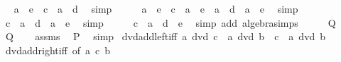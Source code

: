 \begin{isabellebody}
\ \isamarkupfalse%
\ {\isachardoublequoteopen}a\ {\isacharasterisk}{\kern0pt}\ e\ {\isacharplus}{\kern0pt}\ c\ {\isacharequal}{\kern0pt}\ a\ {\isacharasterisk}{\kern0pt}\ d{\isachardoublequoteclose}\ \isamarkupfalse%
\ simp\isanewline
\ \ \isamarkupfalse%
\ \isamarkupfalse%
\ {\isachardoublequoteopen}a\ {\isacharasterisk}{\kern0pt}\ e\ {\isacharplus}{\kern0pt}\ c\ {\isacharminus}{\kern0pt}\ a\ {\isacharasterisk}{\kern0pt}\ e\ {\isacharequal}{\kern0pt}\ a\ {\isacharasterisk}{\kern0pt}\ d\ {\isacharminus}{\kern0pt}\ a\ {\isacharasterisk}{\kern0pt}\ e{\isachardoublequoteclose}\ \isamarkupfalse%
\ simp\isanewline
\ \ \isamarkupfalse%
\ \isamarkupfalse%
\ {\isachardoublequoteopen}c\ {\isacharequal}{\kern0pt}\ a\ {\isacharasterisk}{\kern0pt}\ d\ {\isacharminus}{\kern0pt}\ a\ {\isacharasterisk}{\kern0pt}\ e{\isachardoublequoteclose}\ \isamarkupfalse%
\ simp\isanewline
\ \ \isamarkupfalse%
\ \isamarkupfalse%
\ {\isachardoublequoteopen}c\ {\isacharequal}{\kern0pt}\ a\ {\isacharasterisk}{\kern0pt}\ {\isacharparenleft}{\kern0pt}d\ {\isacharminus}{\kern0pt}\ e{\isacharparenright}{\kern0pt}{\isachardoublequoteclose}\ \isamarkupfalse%
\ {\isacharparenleft}{\kern0pt}simp\ add{\isacharcolon}{\kern0pt}\ algebra{\isacharunderscore}{\kern0pt}simps{\isacharparenright}{\kern0pt}\isanewline
\ \ \isamarkupfalse%
\ \isamarkupfalse%
\ {\isacharquery}{\kern0pt}Q\ \isacommand{{\isachardot}{\kern0pt}{\isachardot}{\kern0pt}}\isamarkupfalse%
\isanewline
{}\isamarkupfalse%
\isanewline
\ \ \isamarkupfalse%
\ {\isacharquery}{\kern0pt}Q\isanewline
\ \ \isamarkupfalse%
\ assms\ \isamarkupfalse%
\ {\isacharquery}{\kern0pt}P\ \isamarkupfalse%
\ simp\isanewline
{}\isamarkupfalse%
%
\endisatagproof
{\isafoldproof}%
%
\isadelimproof
\isanewline
%
\endisadelimproof
\isanewline
{}\isamarkupfalse%
\ dvd{\isacharunderscore}{\kern0pt}add{\isacharunderscore}{\kern0pt}left{\isacharunderscore}{\kern0pt}iff{\isacharcolon}{\kern0pt}\ {\isachardoublequoteopen}a\ dvd\ c\ {\isasymLongrightarrow}\ a\ dvd\ b\ {\isacharplus}{\kern0pt}\ c\ {\isasymlongleftrightarrow}\ a\ dvd\ b{\isachardoublequoteclose}\isanewline
%
\isadelimproof
\ \ %
\endisadelimproof
%
\isatagproof
{}\isamarkupfalse%
\ dvd{\isacharunderscore}{\kern0pt}add{\isacharunderscore}{\kern0pt}right{\isacharunderscore}{\kern0pt}iff\ {\isacharbrackleft}{\kern0pt}of\ a\ c\ b{\isacharbrackright}{\kern0pt}\ \isamarkupfalse%

\end{isabellebody}
